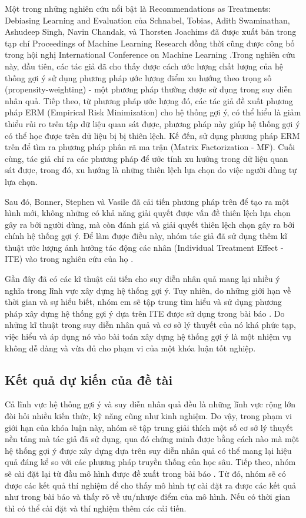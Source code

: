 \documentclass{article}[14pt]
\begin{document}
{    
    Một trong những nghiên cứu nổi bật là {Recommendations as Treatments: Debiasing Learning and Evaluation} của Schnabel, Tobias, Adith Swaminathan, Ashudeep Singh, Navin Chandak, và Thorsten Joachims đã được xuất bản trong tạp chí {Proceedings of Machine Learning Research} đồng thời cũng được công bố trong hội nghị {International Conference on Machine Learning} \cite{pmlr}.Trong nghiên cứu này, đầu tiên, các tác giả đã cho thấy được cách ước lượng chất lượng của hệ thống gợi ý sử dụng phương pháp ước lượng điểm xu hướng theo trọng số (propensity-weighting) - một phương pháp thường được sử dụng trong suy diễn nhân quả. Tiếp theo, từ phương pháp ước lượng đó, các tác giả đề xuất phương pháp ERM (Empirical Risk Minimization) cho hệ thống gợi ý, có thể hiểu là giảm thiểu rủi ro trên tập dữ liệu quan sát được, phương pháp này giúp  hệ thống gợi ý có thể học được trên dữ liệu bị bị thiên lệch. Kế đến, sử dụng phương pháp ERM trên để tìm ra phương pháp  phân rã ma trận (Matrix Factorization - MF). Cuối cùng, tác giả chỉ ra các phương pháp để ước tính xu hướng trong dữ liệu quan sát được, trong đó, xu hướng là những thiên lệch lựa chọn do việc người dùng tự lựa chọn.
    
    Sau đó, Bonner, Stephen và Vasile đã cải tiến phương pháp trên để tạo ra một hình mới, không những có khả năng giải quyết được vấn đề thiên lệch lựa chọn gây ra bởi người dùng, mà còn đánh giá và giải quyết thiên lệch chọn gây ra bởi chính hệ thống gợi ý. Để làm được điều này, nhóm tác giả đã sử dụng thêm kĩ thuật ước lượng ảnh hưởng tác động các nhân (Individual Treatment Effect - ITE)  \cite{rubin} vào trong nghiên cứu của họ \cite{cause}.
    
    Gần đây đã có các kĩ thuật cải tiến cho suy diễn nhân quả mang lại nhiều ý nghĩa trong lĩnh vực xây dựng hệ thống gợi ý. Tuy nhiên, do những giới hạn về thời gian và sự hiểu biết, nhóm em sẽ tập trung tìm hiểu và sử dụng phương pháp xây dựng hệ thống gợi ý dựa trên ITE được sử dụng trong bài báo \cite{cause}. Do những kĩ thuật trong suy diễn nhân quả và cơ sở lý thuyết của nó khá phức tạp, việc hiểu và áp dụng nó vào bài toán xây dựng hệ thống gợi ý là một nhiệm vụ không dễ dàng và vừa đủ cho phạm vi của một khóa luận tốt nghiệp.

    
    \subsection{Kết quả dự kiến của đề tài}
        
    Cả lĩnh vực hệ thống gợi ý và suy diễn nhân quả đều là những lĩnh vực rộng lớn đòi hỏi nhiều kiến thức, kỹ năng cũng như kinh nghiệm. Do vậy, trong phạm vi giới hạn của khóa luận này, nhóm sẽ tập trung giải thích một số cơ sở lý thuyết nền tảng mà tác giả đã sử dụng, qua đó chứng minh được bằng cách nào mà một hệ thống gợi ý được xây dựng dựa trên suy diễn nhân quả có thể mang lại hiệu quả đáng kể so với các phương pháp truyền thống của học sâu. Tiếp theo, nhóm sẽ cài đặt lại từ đầu mô hình được đề xuất trong bài báo \cite{cause}. Từ đó, nhóm sẽ có được các kết quả thí nghiệm để cho thấy mô hình tự cài đặt ra được các kết quả như trong bài báo và thấy rõ về ưu/nhược điểm của mô hình. Nếu có thời gian thì có thể cài đặt và thí nghiệm thêm các cải tiến.
   
}
\end{document}
